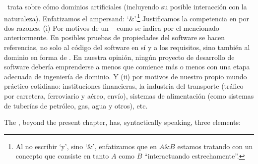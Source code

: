 \begynd
\pind  {} \manual\ trata sobre cómo  dominios artificiales
      (incluyendo su posible interacción con la naturaleza).
      \pind Enfatizamos el ampersand: `\&'.\footnote{Al no escribir `y', sino `\&', enfatizamos que en
      ${A\&B}$ estamos tratando con un  concepto que consiste en
      tanto $A$ como $B$ ``interactuando estrechamente''.}
\pind Justificamos la competencia en 
      por dos razones.
\begynd
\pind (i) Por motivos de un  -- como se indica por el  mencionado anteriormente. En  %
      posibles pruebas de propiedades del software se hacen referencias, no
      solo al código del software en sí y a los requisitos, sino también
      al dominio en forma de . En nuestra opinión, ningún proyecto de desarrollo de software debería
      emprenderse a menos que comience más o menos con una etapa adecuada de ingeniería
      de dominio. Y
\pind (ii) por motivos de  nuestro propio
      mundo práctico cotidiano: instituciones financieras, la industria del transporte
      (tráfico por carretera, ferroviario y aéreo, envío), sistemas de alimentación
      (como sistemas de tuberías de petróleo, gas, agua y otros), etc.
\afslut
\afslut


\label{sec:Structure}

\begynd
\pind The \primer, beyond the present chapter, has, syntactically
speaking, three elements:
\afslut

